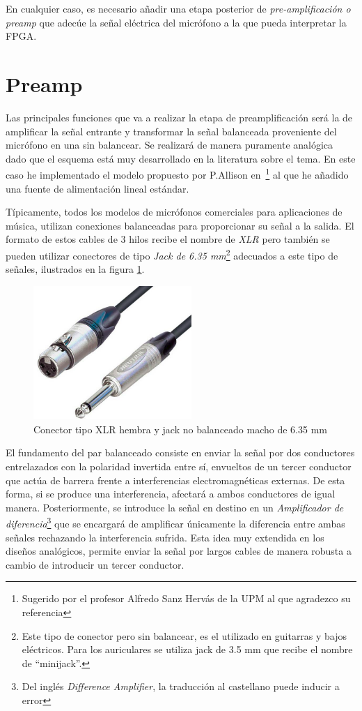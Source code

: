 En cualquier caso, es necesario añadir una etapa posterior de \emph{pre-amplificación o preamp} que adecúe la señal eléctrica del micrófono a la que pueda interpretar la FPGA. 

\section{Preamp}

Las principales funciones que va a realizar la etapa de preamplificación será la de amplificar la señal entrante y transformar la señal balanceada proveniente del micrófono en una sin balancear. Se realizará de manera puramente analógica dado que el esquema está muy desarrollado en la literatura sobre el tema. En este caso he implementado el modelo propuesto por P.Allison en~\cite{Preamp}\footnote{Sugerido por el profesor Alfredo Sanz Hervás de la UPM al que agradezco su referencia} al que he añadido una fuente de alimentación lineal estándar.

Típicamente, todos los modelos de micrófonos comerciales para aplicaciones de música, utilizan conexiones balanceadas para proporcionar su señal a la salida. El formato de estos cables de 3 hilos recibe el nombre de \emph{XLR} pero también se pueden utilizar conectores de tipo \emph{Jack de 6.35 mm}\footnote{Este tipo de conector pero sin balancear, es el utilizado en guitarras y bajos eléctricos. Para los auriculares se utiliza jack de 3.5 mm que recibe el nombre de ``minijack''.} adecuados a este tipo de señales, ilustrados en la figura \ref{fig:conec}.

\begin{figure}[!htb]
\begin{center}
\includegraphics[width=6cm]{img/canonyjack.png}
\caption{\label{fig:conec}Conector tipo XLR hembra y jack no balanceado macho de 6.35 mm}
\end{center}
\end{figure}

El fundamento del par balanceado consiste en enviar la señal por dos conductores entrelazados con la polaridad invertida entre sí, envueltos de un tercer conductor que actúa de barrera frente a interferencias electromagnéticas externas. De esta forma, si se produce una interferencia, afectará a ambos conductores de igual manera. Posteriormente, se introduce la señal en destino en un \emph{Amplificador de diferencia}\footnote{Del inglés \emph{Difference Amplifier}, la traducción al castellano puede inducir a error} que se encargará de amplificar únicamente la diferencia entre ambas señales rechazando la interferencia sufrida. Esta idea muy extendida en los diseños analógicos, permite enviar la señal por largos cables de manera robusta a cambio de introducir un tercer conductor. 

